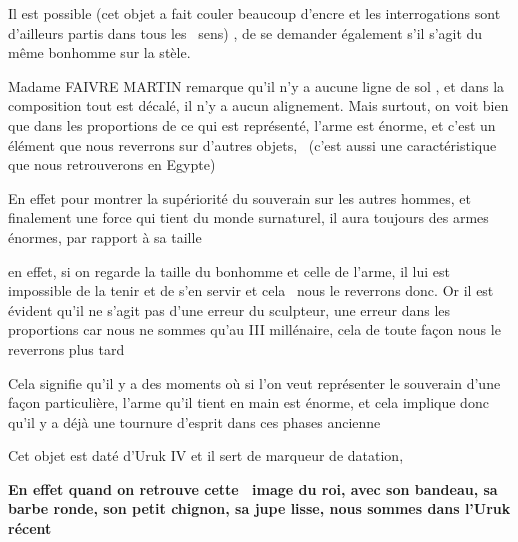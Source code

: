 \documentclass[a4paper]{article}
\begin{document}
{
Il est possible (cet objet a fait couler beaucoup d'encre et les interrogations sont d'ailleurs partis dans tous les
\ sens) , de se demander également s'il s'agit du même bonhomme sur la stèle.}

{
Madame FAIVRE MARTIN remarque qu'il n'y a aucune ligne de sol , et dans la composition tout est décalé, il n'y a aucun
alignement. Mais surtout, on voit bien que dans les proportions de ce qui est représenté, l'arme est énorme, et c'est
un élément que nous reverrons sur d'autres objets, \ (c'est aussi une caractéristique que nous retrouverons en Egypte)}

{
En effet pour montrer la supériorité du souverain sur les autres hommes, et finalement une force qui tient du monde
surnaturel, il aura toujours des armes énormes, par rapport à sa taille }

{
en effet, si on regarde la taille du bonhomme et celle de l'arme, il lui est impossible de la tenir et de s'en servir et
cela \ nous le reverrons donc. Or il est évident qu'il ne s'agit pas d'une erreur du sculpteur, une erreur dans les
proportions car nous ne sommes qu'au III millénaire, cela de toute façon nous le reverrons plus tard}

{
Cela signifie qu'il y a des moments où si l'on veut représenter le souverain d'une façon particulière, l'arme qu'il
tient en main est énorme, et cela implique donc qu'il y a déjà une tournure d'esprit dans ces phases ancienne}


\bigskip

{
Cet objet est daté d'Uruk IV et il sert de marqueur de datation, }

{
\textbf{En effet quand on retrouve cette \ image du roi, avec son bandeau, sa barbe ronde, son petit chignon, sa jupe
lisse, nous sommes dans l'Uruk récent}}


\bigskip


\bigskip


\bigskip


\bigskip


\bigskip


\bigskip


\bigskip


\bigskip


\bigskip


\bigskip


\bigskip
\end{document}
